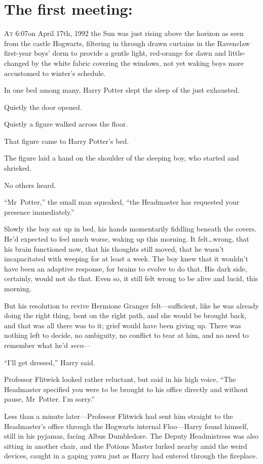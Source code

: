 
\section{The first meeting:}

\lettrine{A}{t} 6:07\AM on April 17th, 1992 the Sun was just rising above the horizon as seen from the castle Hogwarts, filtering in through drawn curtains in the Ravenclaw first-year boys’ dorm to provide a gentle light, red-orange for dawn and little-changed by the white fabric covering the windows, not yet waking boys more accustomed to winter’s schedule.

In one bed among many, Harry Potter slept the sleep of the just exhausted.

Quietly the door opened.

Quietly a figure walked across the floor.

That figure came to Harry Potter’s bed.

The figure laid a hand on the shoulder of the sleeping boy, who started and shrieked.

No others heard.

“Mr~Potter,” the small man squeaked, “the Headmaster has requested your presence immediately.”

Slowly the boy sat up in bed, his hands momentarily fiddling beneath the covers. He’d expected to feel much worse, waking up this morning. It felt…wrong, that his brain functioned now, that his thoughts still moved, that he wasn’t incapacitated with weeping for at least a week. The boy knew that it wouldn’t have been an adaptive response, for brains to evolve to do that. His dark side, certainly, would not do that. Even so, it still felt wrong to be alive and lucid, this morning.

But his resolution to revive Hermione Granger felt—sufficient, like he was already doing the right thing, bent on the right path, and she would be brought back, and that was all there was to it; grief would have been giving up. There was nothing left to decide, no ambiguity, no conflict to tear at him, and no need to remember what he’d \emph{seen}—

“I’ll get dressed,” Harry said.

Professor Flitwick looked rather reluctant, but said in his high voice, “The Headmaster specified you were to be brought to his office directly and without pause, Mr~Potter. I’m sorry.”

Less than a minute later—Professor Flitwick had sent him straight to the Headmaster’s office through the Hogwarts internal Floo—Harry found himself, still in his pyjamas, facing Albus Dumbledore. The Deputy Headmistress was also sitting in another chair, and the Potions Master lurked nearby amid the weird devices, caught in a gaping yawn just as Harry had entered through the fireplace.

